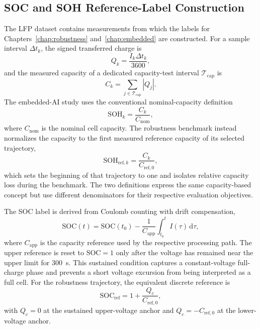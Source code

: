 \documentclass[
    a4paper,
    12pt,
    titlepage,
    bibliography=totoc,
    twoside=on,
    parskip=false,
    numbers=noenddot,
    cleardoublepage=empty,
    DIV=12,
    BCOR=12.0mm,
    headheight=36pt,
    headings=openright
]{scrreprt}
\begin{document}
\subsection{SOC and SOH Reference-Label Construction}
The LFP dataset contains measurements from which the labels for Chapters~\ref{chap:robustness} and~\ref{chap:embedded} are constructed. For a sample interval $\Delta t_k$, the signed transferred charge is
\begin{equation}
    Q_k=\frac{I_k\Delta t_k}{3600},
    \label{eq:robustness_reference_charge_increment}
\end{equation}
and the measured capacity of a dedicated capacity-test interval $\mathcal{T}_{\mathrm{cap}}$ is
\begin{equation}
    C_k=\sum_{j\in\mathcal{T}_{\mathrm{cap}}}\left|Q_j\right|.
    \label{eq:robustness_reference_capacity}
\end{equation}
The embedded-AI study uses the conventional nominal-capacity definition
\begin{equation}
    \mathrm{SOH}_k=\frac{C_k}{C_{\mathrm{nom}}},
    \label{eq:lfp_soh_reference}
\end{equation}
where $C_{\mathrm{nom}}$ is the nominal cell capacity. The robustness benchmark instead normalizes the capacity to the first measured reference capacity of its selected trajectory,
\begin{equation}
    \mathrm{SOH}_{\mathrm{ref},k}
    =
    \frac{C_k}{C_{\mathrm{ref},0}},
    \label{eq:robustness_reference_soh}
\end{equation}
which sets the beginning of that trajectory to one and isolates relative capacity loss during the benchmark. The two definitions express the same capacity-based concept but use different denominators for their respective evaluation objectives.\autocite{plettBatteryManagementSystems2015,berecibarCriticalReviewState2016}

The SOC label is derived from Coulomb counting with drift compensation,
\begin{equation}
\mathrm{SOC}(t)=\mathrm{SOC}(t_0)-\frac{1}{C_{\mathrm{app}}}\int_{t_0}^{t} I(\tau)\,\mathrm{d}\tau,
\label{eq:lfp_soc_reference}
\end{equation}
where $C_{\mathrm{app}}$ is the capacity reference used by the respective processing path. The upper reference is reset to $\mathrm{SOC}=1$ only after the voltage has remained near the upper limit for \SI{300}{\second}. This sustained condition captures a constant-voltage full-charge phase and prevents a short voltage excursion from being interpreted as a full cell. For the robustness trajectory, the equivalent discrete reference is
\begin{equation}
    \mathrm{SOC}_{\mathrm{ref}}
    =
    1+\frac{Q_c}{C_{\mathrm{ref},0}},
    \label{eq:robustness_reference_soc}
\end{equation}
with $Q_c=0$ at the sustained upper-voltage anchor and $Q_c=-C_{\mathrm{ref},0}$ at the lower-voltage anchor.
\end{document}
